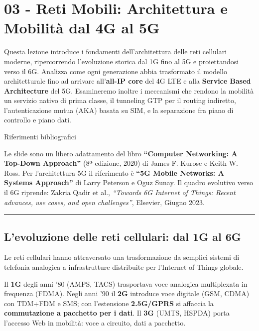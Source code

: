 \documentclass[
  italian,
  openany]{book}
\begin{document}
\newpage

\chapter{03 - Reti Mobili: Architettura e Mobilità dal 4G al
5G}\label{reti-mobili-architettura-e-mobilituxe0-dal-4g-al-5g}

Questa lezione introduce i fondamenti dell'architettura delle reti
cellulari moderne, ripercorrendo l'evoluzione storica dal 1G fino al 5G
e proiettandosi verso il 6G. Analizza come ogni generazione abbia
trasformato il modello architetturale fino ad arrivare
all'\textbf{all-IP core} del 4G LTE e alla \textbf{Service Based
Architecture} del 5G. Esamineremo inoltre i meccanismi che rendono la
mobilità un servizio nativo di prima classe, il tunneling GTP per il
routing indiretto, l'autenticazione mutua (AKA) basata su SIM, e la
separazione fra piano di controllo e piano dati.

\begin{calloutnote}{Riferimenti bibliografici}

Le slide sono un libero adattamento del libro \textbf{``Computer
Networking: A Top-Down Approach''} (8ª edizione, 2020) di James F.
Kurose e Keith W. Ross. Per l'architettura 5G il riferimento è
\textbf{``5G Mobile Networks: A Systems Approach''} di Larry Peterson e
Oguz Sunay. Il quadro evolutivo verso il 6G riprende: Zakria Qadir et
al., \emph{``Towards 6G Internet of Things: Recent advances, use cases,
and open challenges''}, Elsevier, Giugno 2023.

\end{calloutnote}

\begin{center}\rule{0.5\linewidth}{0.5pt}\end{center}

\section{L'evoluzione delle reti cellulari: dal 1G al
6G}\label{levoluzione-delle-reti-cellulari-dal-1g-al-6g}

Le reti cellulari hanno attraversato una trasformazione da semplici
sistemi di telefonia analogica a infrastrutture distribuite per
l'Internet of Things globale.

Il \textbf{1G} degli anni '80 (AMPS, TACS) trasportava voce analogica
multiplexata in frequenza (FDMA). Negli anni '90 il \textbf{2G}
introduce voce digitale (GSM, CDMA) con TDM+FDM e SMS; con l'estensione
\textbf{2.5G/GPRS} si affaccia la \textbf{commutazione a pacchetto per i
dati}. Il \textbf{3G} (UMTS, HSPDA) porta l'accesso Web in mobilità:
voce a circuito, dati a pacchetto.
\end{document}
